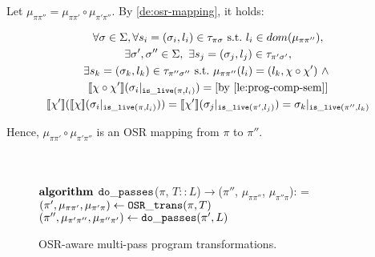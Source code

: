 \begin{myproof} 
Let $\mu_{\pi\pi''}=\mu_{\pi\pi'}\circ\mu_{\pi'\pi''}$. By \mydefinition\ref{de:osr-mapping}, it holds:
\begin{small}
\begin{gather*}
\forall \sigma\in\Sigma, \forall s_i=(\sigma_i,l_i)\in\tau_{\pi\sigma}~\text{s.t.}~l_i\in dom(\mu_{\pi\pi''}),\\
\exists \sigma',\sigma''\in\Sigma,~\exists s_j=(\sigma_j,l_j)\in\tau_{\pi'\sigma'}, \\ \exists s_k=(\sigma_k,l_k)\in\tau_{\pi''\sigma''}~\text{s.t.}~
\mu_{\pi\pi''}(l_i)=(l_k,\chi\circ\chi')~\wedge~\\ \mysem{\chi\circ\chi'}(\sigma_i\vert_{\live(\pi,l_i)})=\text{[by \ref{le:prog-comp-sem}]}\\
\mysem{\chi'}(\mysem{\chi}(\sigma_i\vert_{\live(\pi,l_i)}))=
\mysem{\chi'}(\sigma_j\vert_{\live(\pi',l_j)})=\sigma_k\vert_{\live(\pi'',l_k)}
\end{gather*}
\end{small}
Hence, $\mu_{\pi\pi'}\circ\mu_{\pi'\pi''}$ is an OSR mapping from $\pi$ to $\pi''$.
\end{myproof}

\ifdefined\noauthorea
\begin{figure}[ht!]
\IncMargin{2em}
\begin{algorithm}[H]
\DontPrintSemicolon
\LinesNumbered
\SetAlgoNoLine
\SetNlSkip{1em} 
\Indm\Indmm
\hrulefill\\
\nonl\vspace{-2mm}\hrulefill\\
\nonl$\mathbf{algorithm} \> \> \text{${\tt do\_passes}$}$($\pi$, $T::L$)$\rightarrow$($\pi''$, $\mu_{\pi\pi''}$, $\mu_{\pi''\pi}$):\;
\everypar={\nl}
\Indp\Indpp
\vspace{1mm} $(\pi',\mu_{\pi\pi'},\mu_{\pi'\pi})\gets \text{${\tt OSR\_trans}$}(\pi,T)$\;
$(\pi'',\mu_{\pi'\pi''},\mu_{\pi''\pi'})\gets \text{${\tt do\_passes}$}(\pi',L)$\;
\;
\vspace{-2mm}
\Indm\Indmm
\nonl\hrulefill\vspace{1mm}\\
\DecMargin{2.5em}
\caption{\label{alg:osr-trans-compose} OSR-aware multi-pass program transformations.}
\IncMargin{2.5em}
\end{algorithm} 
\end{figure}

